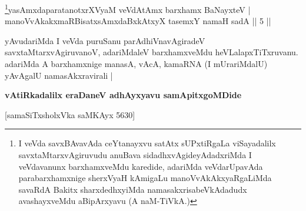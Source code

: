 \begin{shl}\footnote{I veVda savxBAvavAda ceYtanayxvu satAtx sUPxtiRgaLa viSayadalilx savxtaMtarxvAgiruvudu anuBava sidadhxvAgideyAdadxriMda I veVdavanunx barxhamxveMdu karedide, adariMda veVdarUpavAda parabarxhamxnige sherxVyaH kAmigaLu manoVvAkAkxyaRgaLiMda savaRdA Bakitx sharxdedhxyiMda namasakxrisabeVkAdadudx avashayxveMdu aBipArxyavu (A naM-TiVkA.)}yasAmxdaparatanotxrXV\s yaM veVdAtAmx barxhamx BaNayxteV |\\
manoVvAkakxmaRBisatxsAmxdaBxkAtxyX tasemxY namaH sadA \hfill || 5 ||
\end{shl}

\begin{artha}
yAvudariMda I veVda puruSanu parAdhiVnavAgiradeV
savxtaMtarxvAgiruvanoV, adariMdaleV barxhamxveMdu
heVLalapxTiTxruvanu. adariMda A barxhamxnige manasA, vAcA, kamaRNA
(I mUrariMdalU) yAvAgalU namasAkxravirali |
\end{artha}

\begin{center}
\textbf{vAtiRkadalilx eraDaneV adhAyxyavu samApitxgoMDide }

\medskip

 [samaSiTxsholxVka saMKAyx 5630]
\end{center}

